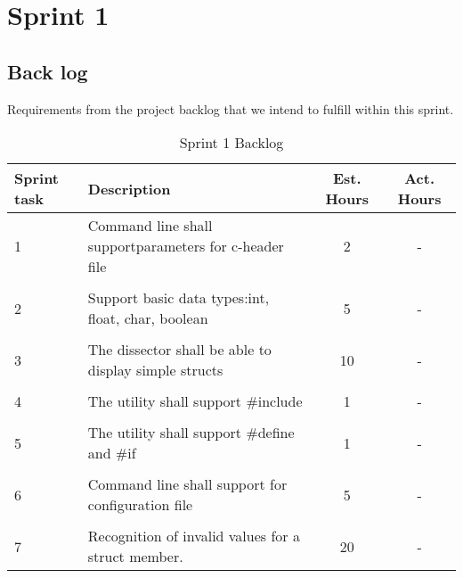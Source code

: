 \chapter{Sprint 1}

\section{Back log}
Requirements from the project backlog that we intend to fulfill within this sprint.

\begin{table}[ht] \center
\caption{Sprint 1 Backlog}

\begin{tabular}{p{1cm} p{6cm} c  c}
	Sprint task & Description & Est. Hours & Act. Hours \\
	\hline
	1 & Command line shall support\newline parameters for c-header file & 2 & -\\
	 & &  & \\
	2 & Support basic data types:\newline int, float, char, boolean & 5 & -\\	
	 & &  & \\
	3 & The dissector shall be able to display simple structs & 10 & -\\
	 & &  & \\
	4 & The utility shall support \#include & 1 & -\\
	 & &  & \\
	5 & The utility shall support \#define and \#if & 1 & -\\	
	 & &  & \\
	6 & Command line shall support for configuration file & 5 & -\\
	 & &  & \\
	7 & Recognition of invalid values for a struct member. & 20 & -\\
\end{tabular}
\end{table}

